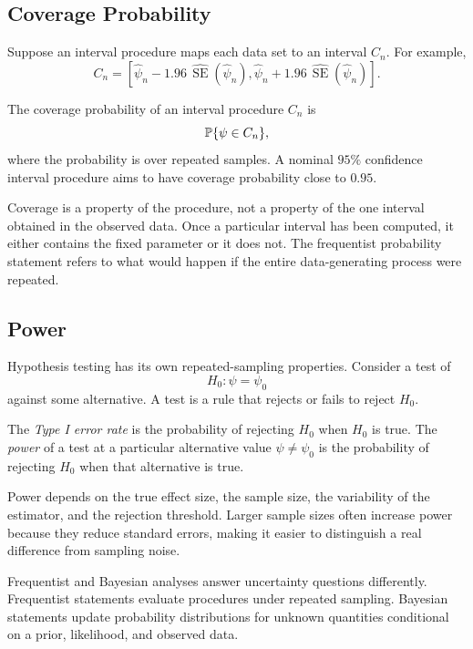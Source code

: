 \subsection{Coverage Probability}

Suppose an interval procedure maps each data set to an interval $C_n$. For example,
\[
C_n=\left[
\hat\psi_n-1.96\,\widehat{\operatorname{SE}}(\hat\psi_n),
\hat\psi_n+1.96\,\widehat{\operatorname{SE}}(\hat\psi_n)
\right].
\]

\begin{definition}
The coverage probability of an interval procedure $C_n$ is
\[
\mathbb{P}\{\psi\in C_n\},
\]
where the probability is over repeated samples. A nominal $95\%$ confidence interval procedure aims to have coverage probability close to $0.95$.
\end{definition}

Coverage is a property of the procedure, not a property of the one interval obtained in the observed data. Once a particular interval has been computed, it either contains the fixed parameter or it does not. The frequentist probability statement refers to what would happen if the entire data-generating process were repeated.

\subsection{Power}

Hypothesis testing has its own repeated-sampling properties. Consider a test of
\[
H_0:\psi=\psi_0
\]
against some alternative. A test is a rule that rejects or fails to reject $H_0$.

\begin{definition}
The \emph{Type I error rate} is the probability of rejecting $H_0$ when $H_0$ is true. The \emph{power} of a test at a particular alternative value $\psi\ne\psi_0$ is the probability of rejecting $H_0$ when that alternative is true.
\end{definition}

Power depends on the true effect size, the sample size, the variability of the estimator, and the rejection threshold. Larger sample sizes often increase power because they reduce standard errors, making it easier to distinguish a real difference from sampling noise.

\begin{keyidea}
Frequentist and Bayesian analyses answer uncertainty questions differently. Frequentist statements evaluate procedures under repeated sampling. Bayesian statements update probability distributions for unknown quantities conditional on a prior, likelihood, and observed data.
\end{keyidea}
